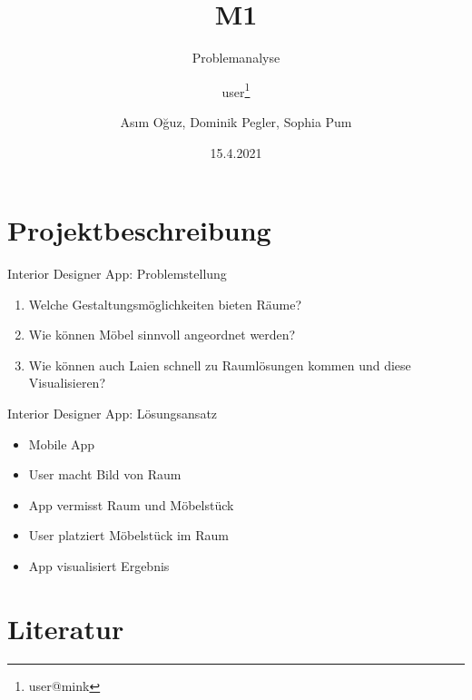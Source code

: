 \documentclass[presentation,bigger,aspectratio=169]{beamer}
\author{user\thanks{user@mink}}
\date{15.4.2021}
\title{M1}
\subtitle{Problemanalyse}
\author[A.Oğuz, D.Pegler, S.Pum]{Asım Oğuz, Dominik Pegler, Sophia Pum}
\institute{Universität Wien, Fakultät für Informatik (SS2021)}
\begin{document}
\maketitle

\section{Projektbeschreibung}
\label{sec:org773d9e2}
\begin{frame}[label={sec:org49bfaac}]{\vspace{2.2cm}\begin{center}\MakeUppercase{\insertsection}\end{center}}
\end{frame}

\begin{frame}[label={sec:org73d89db}]{Interior Designer App: Problemstellung}
\begin{enumerate}
\item Welche Gestaltungsmöglichkeiten bieten Räume?
\item Wie können Möbel sinnvoll angeordnet werden?
\item Wie können auch Laien schnell zu Raumlösungen kommen und diese
Visualisieren?
\end{enumerate}
\end{frame}
\begin{frame}[label={sec:org3189320}]{Interior Designer App: Lösungsansatz}
\begin{itemize}
\item Mobile App
\item User macht Bild von Raum
\item App vermisst Raum und Möbelstück
\item User platziert Möbelstück im Raum
\item App visualisiert Ergebnis
\end{itemize}
\end{frame}

\section{Literatur}
\label{sec:org9c45cac}
\begin{frame}[label={sec:orgb89d740}]{\vspace{2.2cm}\begin{center}\MakeUppercase{\insertsection}\end{center}}
\end{frame}
\end{document}
